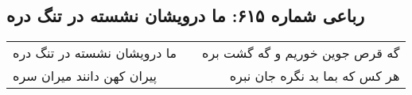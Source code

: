 \begin{center}
\section*{رباعی شماره ۶۱۵: ما درویشان نشسته در تنگ دره}
\label{sec:sh615}
\begin{longtable}{l p{0.5cm} r}
ما درویشان نشسته در تنگ دره
&&
گه قرص جوین خوریم و گه گشت بره
\\
پیران کهن دانند میران سره
&&
هر کس که بما بد نگره جان نبره
\\
\end{longtable}
\end{center}
